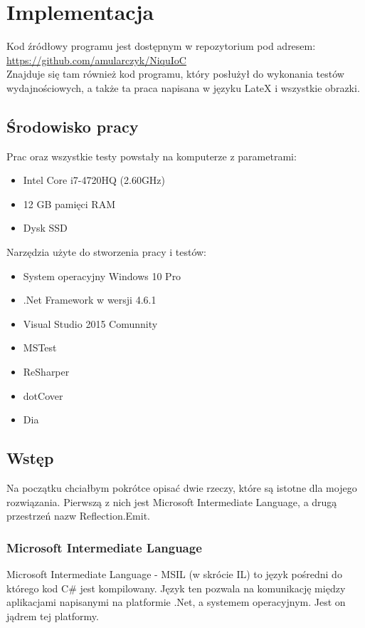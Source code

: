 \documentclass[12pt]{article}
\begin{document}
\clearpage
\section{Implementacja}
Kod źródłowy programu jest dostępnym w repozytorium pod adresem:\\
\url{https://github.com/amularczyk/NiquIoC}\\
Znajduje się tam również kod programu, który posłużył do wykonania testów wydajnościowych, a także ta praca napisana w języku LateX i wszystkie obrazki.

\subsection{Środowisko pracy}
Prac oraz wszystkie testy powstały na komputerze z parametrami:
\begin{itemize}
	\item Intel Core i7-4720HQ (2.60GHz)
	\item 12 GB pamięci RAM
	\item Dysk SSD
\end{itemize}
Narzędzia użyte do stworzenia pracy i testów:
\begin{itemize}
	\item {\color{red} System operacyjny Windows 10 Pro}
	\item .Net Framework w wersji 4.6.1
	\item Visual Studio 2015 Comunnity
	\item MSTest
	\item ReSharper
	\item dotCover
	\item Dia
\end{itemize}


\subsection{Wstęp}
Na początku chciałbym pokrótce opisać dwie rzeczy, które są istotne dla mojego rozwiązania. Pierwszą z nich jest Microsoft Intermediate Language, a drugą przestrzeń nazw Reflection.Emit.

\subsubsection{Microsoft Intermediate Language}
Microsoft Intermediate Language - MSIL (w skrócie IL) to język pośredni do którego kod C\# jest kompilowany. Język ten pozwala na komunikację między aplikacjami napisanymi na platformie .Net, a systemem operacyjnym. Jest on jądrem tej platformy.
\end{document}
